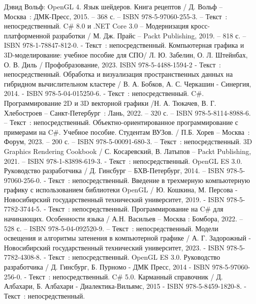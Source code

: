 
\begin{thebibliography}{13}

    	Дэвид Вольф: OpenGL 4. Язык шейдеров. Книга рецептов / Д. Вольф – Москва~: ДМК-Пресс, 2015. – 368 с. – ISBN 978-5-97060-255-3. – Текст~: непосредственный.
    	C\# 8.0 и .NET Core 3.0 – Модернизация кросс-платформенной разработки / М. Дж. Прайс – Packt Publishing, 2019. – 818 с. – ISBN 978-1-78847-812-0. - Текст~: непосредственный.
    	Компьютерная графика и 3D-моделирование: учебное пособие для СПО/  Л. Ю. Забелин, О. Л. Штейнбах, О. В. Диль / Профобразование, 2023. ISBN 978-5-4488-1594-2 - Текст~: непосредственный.
    	Обработка и визуализация пространственных данных на гибридном вычислительном кластере / В. А. Бобков, А. С. Черкашин - Синергия, 2014. - ISBN 978-5-04-015250-6. - Текст~: непосредственный.
    	C\#. Программирование 2D и 3D векторной графики /Н. А. Тюкачев, В. Г. Хлебостроев – Санкт-Петербург~: Лань, 2022. – 320 с. – ISBN 978-5-8114-8988-6. – Текст~: непосредственный.
		Объектно-ориентированное программирование с примерами на C\#. Учебное пособие. Студентам ВУЗов. / П.Б. Хорев – Москва~: Форум, 2023. – 200 с. – ISBN 978-5-00091-680-3. – Текст~: непосредственный.
		3D Graphics Rendering Cookbook / С. Косаревский, В. Латыпов – Packt Publishing, 2021. – ISBN 978-1-83898-619-3. - Текст~: непосредственный.
		OpenGL ES 3.0. Руководство разработчика / Д. Гинсбург – БХВ-Петербург, 2014. – ISBN 978-5-97060-256-0. - Текст~: непосредственный.
		Введение в трехмерную компьютерную графику с использованием библиотеки OpenGL / Ю. Кошкина, М. Персова - Новосибирский государственный технический университет, 2019. - ISBN 978-5-7782-3744-5. - Текст~: непосредственный.
		Программирование на C\# для начинающих. Особенности языка / А.Н. Васильев  – Москва : Бомбора, 2022. – 528 с. – ISBN 978-5-04-092520-9. – Текст~: непосредственный.
		Модели освещения и алгоритмы затенения в компьютерной графике / А. Г. Задорожный - Новосибирский государственный технический университет, 2023. - ISBN 978-5-7782-4308-8. - Текст~: непосредственный.
		OpenGL ES 3.0. Руководство разработчика / Д. Гинсбург, Б. Пурномо - ДМК Пресс, 2014 - ISBN 978-5-97060-256-0. - Текст~: непосредственный.
		C\# 5.0. Карманный справочник / Д. Албахари, Б. Албахари - Диалектика-Вильямс, 2015 - ISBN 978-5-8459-1820-8. - Текст~: непосредственный.
\end{thebibliography}